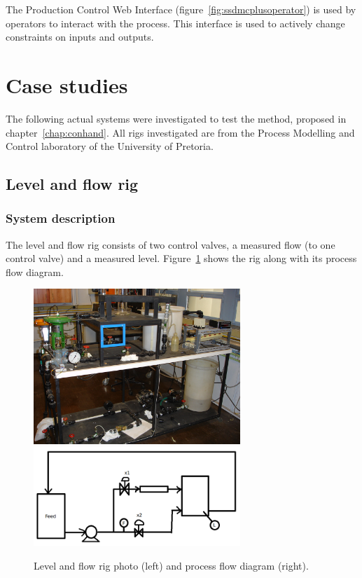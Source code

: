 The Production Control Web Interface (figure~\ref{fig:ssdmcplusoperator}) is used by operators to interact with the process.
This interface is used to actively change constraints on inputs and outputs.

\section{Case studies}
The following actual systems were investigated to test the method, proposed in chapter~\ref{chap:conhand}.
All rigs investigated are from the Process Modelling and Control laboratory of the University of Pretoria.

\subsection{Level and flow rig}
\subsubsection{System description}
The level and flow rig consists of two control valves, a measured flow (to one control valve) and a measured level.
Figure~\ref{fig:flowphoto} shows the rig along with its process flow diagram.
\begin{figure}[htbp]
  \centering
    \includegraphics[width=7.8cm]{graph/flowphoto.JPG}
    \includegraphics[width=7.8cm]{graph/flowpfd}
  \caption[Level and flow rig photo and flow diagram]{Level and flow rig photo (left) and process flow diagram (right).}
  \label{fig:flowphoto}
\end{figure}

